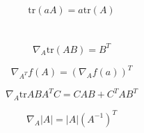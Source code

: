 \documentclass{article}
\begin{document}
\begin{equation}
\text{tr}(aA) = a\text{tr}(A)
\end{equation}
\\
\\
\begin{equation}
\nabla_A\text{tr}(AB) = B^T
\end{equation}

\begin{equation}
\nabla_{A^T}f(A) = {(\nabla_Af(a))}^T
\end{equation}

\begin{equation}
\nabla_{A}\text{tr}ABA^TC = CAB+C^TAB^T
\end{equation}

\begin{equation}
\nabla_{A}|A| = |A|{(A^{-1})}^T
\end{equation}
\end{document}
